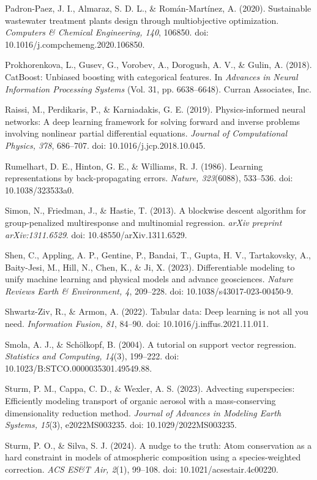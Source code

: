 \documentclass[a4paper,fleqn]{cas-sc}
\begin{document}
\noindent Padron-Paez, J. I., Almaraz, S. D. L., \& Rom\'an-Mart\'inez, A. (2020). Sustainable wastewater treatment plants design through multiobjective optimization. \textit{Computers \& Chemical Engineering, 140}, 106850. doi: 10.1016/j.compchemeng.2020.106850.

\noindent Prokhorenkova, L., Gusev, G., Vorobev, A., Dorogush, A. V., \& Gulin, A. (2018). CatBoost: Unbiased boosting with categorical features. In \textit{Advances in Neural Information Processing Systems} (Vol. 31, pp. 6638--6648). Curran Associates, Inc.

\noindent Raissi, M., Perdikaris, P., \& Karniadakis, G. E. (2019). Physics-informed neural networks: A deep learning framework for solving forward and inverse problems involving nonlinear partial differential equations. \textit{Journal of Computational Physics, 378}, 686--707. doi: 10.1016/j.jcp.2018.10.045.

\noindent Rumelhart, D. E., Hinton, G. E., \& Williams, R. J. (1986). Learning representations by back-propagating errors. \textit{Nature, 323}(6088), 533--536. doi: 10.1038/323533a0.

\noindent Simon, N., Friedman, J., \& Hastie, T. (2013). A blockwise descent algorithm for group-penalized multiresponse and multinomial regression. \textit{arXiv preprint arXiv:1311.6529}. doi: 10.48550/arXiv.1311.6529.

\noindent Shen, C., Appling, A. P., Gentine, P., Bandai, T., Gupta, H. V., Tartakovsky, A., Baity-Jesi, M., Hill, N., Chen, K., \& Ji, X. (2023). Differentiable modeling to unify machine learning and physical models and advance geosciences. \textit{Nature Reviews Earth \& Environment, 4}, 209--228. doi: 10.1038/s43017-023-00450-9.

\noindent Shwartz-Ziv, R., \& Armon, A. (2022). Tabular data: Deep learning is not all you need. \textit{Information Fusion, 81}, 84--90. doi: 10.1016/j.inffus.2021.11.011.

\noindent Smola, A. J., \& Sch\"olkopf, B. (2004). A tutorial on support vector regression. \textit{Statistics and Computing, 14}(3), 199--222. doi: 10.1023/B:STCO.0000035301.49549.88.

\noindent Sturm, P. M., Cappa, C. D., \& Wexler, A. S. (2023). Advecting superspecies: Efficiently modeling transport of organic aerosol with a mass-conserving dimensionality reduction method. \textit{Journal of Advances in Modeling Earth Systems, 15}(3), e2022MS003235. doi: 10.1029/2022MS003235.

\noindent Sturm, P. O., \& Silva, S. J. (2024). A nudge to the truth: Atom conservation as a hard constraint in models of atmospheric composition using a species-weighted correction. \textit{ACS ES\&T Air, 2}(1), 99--108. doi: 10.1021/acsestair.4c00220.
\end{document}
